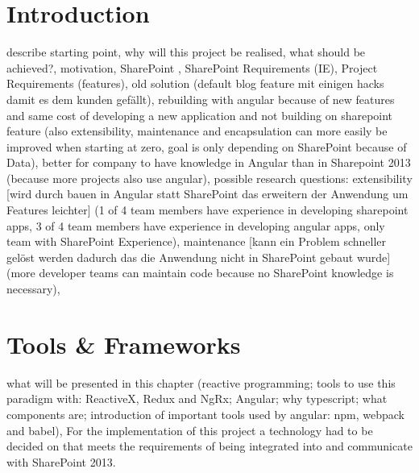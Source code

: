 \documentclass[Bachelor,BIF,english]{twbook}
\begin{document}
{{{    \newcommand{\citefigm}[2]{(Source: taken with modification from \protect\cite{#1}, p. #2)}%
    \newcommand{\citep}{\citeasnoun}%
    \newcommand{\acessedthrough}{Available at:}%
    \newcommand{\acessedthroughp}{Available through:}%
    \newcommand{\acessedat}{Accessed}%
    \newcommand{\singlepage}{p.}%
    \newcommand{\multiplepages}{pp.}%
    \newcommand{\chapternr}{Ch.}%
    \renewcommand{\harvardand}{\&}%
    \newcommand{\abstractonly}{Abstract only}
    \newcommand{\edition}{~edition}%
}}}

\maketitle
\chapter{Introduction}
describe starting point, 
why will this project be realised, what should be achieved?, 
motivation, 
SharePoint \cite{SharePoint}, SharePoint Requirements (IE), Project Requirements (features), old solution (default blog feature mit einigen hacks damit es dem kunden gefällt), 
rebuilding with angular because of new features and same cost of developing a new application and not building on sharepoint feature (also extensibility, maintenance and encapsulation can more easily be improved when starting at zero, goal is only depending on SharePoint because of Data), 
better for company to have knowledge in Angular than in Sharepoint 2013 (because more projects also use angular),
possible research questions: 
extensibility [wird durch bauen in Angular statt SharePoint das erweitern der Anwendung um Features leichter] (1 of 4 team members have experience in developing sharepoint apps, 3 of 4 team members have experience in developing angular apps, only team with SharePoint Experience), 
maintenance [kann ein Problem schneller gelöst werden dadurch das die Anwendung nicht in SharePoint gebaut wurde] (more developer teams can maintain code because no SharePoint knowledge is necessary),
\clearpage


\chapter{Tools \& Frameworks} 
what will be presented in this chapter (reactive programming; tools to use this paradigm with: ReactiveX, Redux and NgRx; Angular; why typescript; what components are; introduction of important tools used by angular: npm, webpack and babel),
For the implementation of this project a technology had to be decided on that meets the requirements of being integrated into and communicate with SharePoint 2013.
\end{document}
